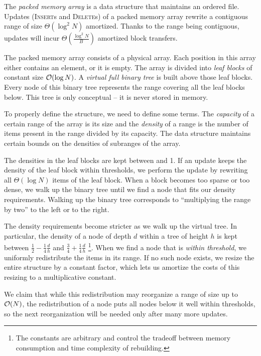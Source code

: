 The \emph{packed memory array} is a data structure that maintains an ordered
file. Updates (\textsc{Insert}s and \textsc{Delete}s) of a packed memory array
rewrite a contiguous range of size $\Theta(\log^2 N)$ amortized.
Thanks to the range being contiguous, updates will incur
$\Theta(\frac{\log^2 N}{B})$ amortized block transfers.

The packed memory array consists of a physical array. Each position in this
array either contains an element, or it is empty.
The array is divided into \emph{leaf blocks} of constant size $\mathcal{O}(\log N)$.
A \emph{virtual full binary tree} is built above those leaf blocks. Every
node of this binary tree represents the range covering all the leaf blocks below.
This tree is only conceptual -- it is never stored in memory.

To properly define the structure, we need to define some terms. The
\emph{capacity} of a certain range of the array is its size and the
\emph{density} of a range is the number of items present in the range divided
by its capacity.
The data structure maintains certain bounds on the densities of subranges of
the array.

The densities in the leaf blocks are kept between  %
and 1. If an update keeps the density of the leaf block within thresholds,
we perform the update by rewriting all $\Theta(\log N)$ items of the leaf block.
When a block becomes too sparse or too dense, we walk up the binary
tree until we find a node that fits our density requirements.
Walking up the binary tree corresponds to ``multiplying the range by two''
to the left or to the right.

The density requirements become stricter as we walk up the virtual tree.
In particular, the density of a node of depth $d$ within a tree of height $h$
is kept between $\frac{1}{2}-\frac{1}{4}\frac{d}{h}$ and $\frac{3}{4}+\frac{1}{4}\frac{d}{h}$
\footnote{The constants are arbitrary and control the tradeoff
between memory consumption and time complexity of rebuilding.}.
When we find a node that is \emph{within threshold}, we uniformly redistribute
the items in its range. If no such node exists, we resize the entire structure
by a constant factor, which lets us amortize the costs of this resizing to
a multiplicative constant.

We claim that while this redistribution may reorganize a range of size up
to $\mathcal{O}(N)$, the redistribution of a node puts all nodes below it well within
thresholds, so the next reorganization will be needed only after many more
updates.

